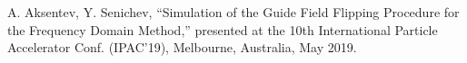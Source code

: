 \documentclass[a4paper]{jacow}
\begin{document}
\begin{thebibliography}{9}
A. Aksentev, Y. Senichev, ``Simulation of the Guide Field Flipping Procedure for the Frequency Domain Method,'' 
presented at the 10th International Particle Accelerator Conf. (IPAC'19), Melbourne, Australia, May 2019.
  


\end{thebibliography}

\end{document}
